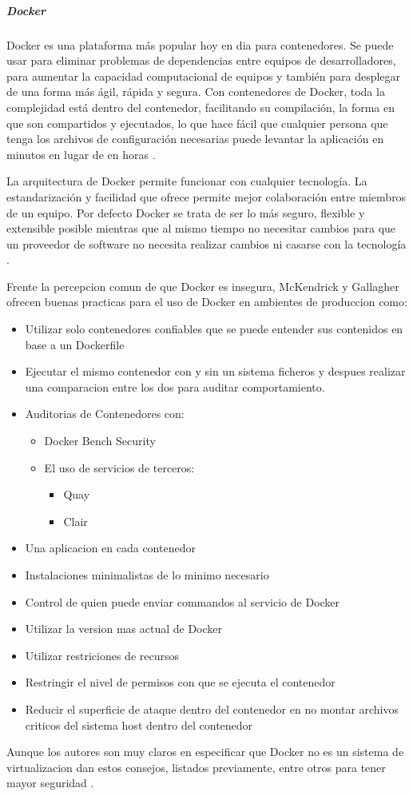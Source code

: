 \subparagraph{Docker}
Docker es una plataforma más popular hoy en dia para contenedores. Se puede usar para eliminar problemas de dependencias entre equipos de desarrolladores, para aumentar la capacidad computacional de equipos y también para desplegar de una forma más ágil, rápida y segura. Con contenedores de Docker, toda la complejidad está dentro del contenedor, facilitando su compilación, la forma en que son compartidos y ejecutados, lo que hace fácil que cualquier persona que tenga los archivos de configuración necesarias puede levantar la aplicación en minutos en lugar de en horas \citep{Docker-What-Is}.

La arquitectura de Docker permite funcionar con cualquier tecnología. La estandarización y facilidad que ofrece permite mejor colaboración entre miembros de un equipo. Por defecto Docker se trata de ser lo más seguro, flexible y extensible posible mientras que al mismo tiempo no necesitar cambios para que un proveedor de software no necesita realizar cambios ni casarse con la tecnología \citep{Docker}.

Frente la percepcion comun de que Docker es insegura, McKendrick y Gallagher ofrecen buenas practicas para el uso de Docker en ambientes de produccion como: 
\begin{itemize}
  \item Utilizar solo contenedores confiables que se puede entender sus contenidos en base a un Dockerfile
  \item Ejecutar el mismo contenedor con y sin un sistema ficheros y despues realizar una comparacion entre los dos para auditar comportamiento.
  \item Auditorias de Contenedores con:
  \begin{itemize}
    \item Docker Bench Security
    \item El uso de servicios de terceros:
    \begin{itemize}
      \item Quay
      \item Clair
    \end{itemize}
  \end{itemize}
  \item Una aplicacion en cada contenedor
  \item Instalaciones minimalistas de lo minimo necesario
  \item Control de quien puede enviar commandos al servicio de Docker
  \item Utilizar la version mas actual de Docker
  \item Utilizar restriciones de recursos
  \item Restringir el nivel de permisos con que se ejecuta el contenedor
  \item Reducir el superficie de ataque dentro del contenedor en no montar archivos criticos del sistema host dentro del contenedor
\end{itemize}
Aunque los autores son muy claros en especificar que Docker no es un sistema de virtualizacion dan estos consejos, listados previamente, entre otros para tener mayor seguridad \citep{McKendrickGallagher201707}.
  

